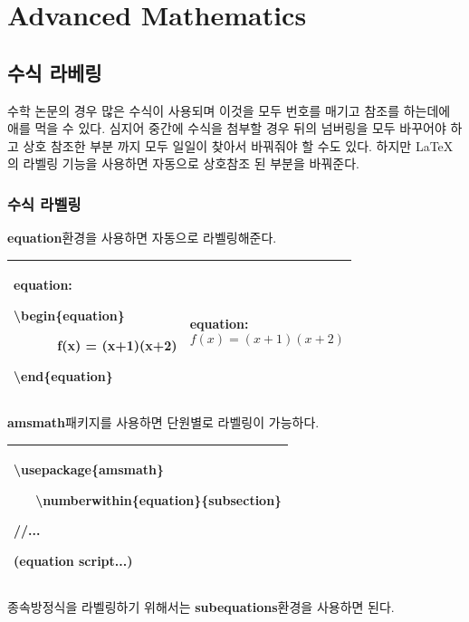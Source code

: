 \documentclass[12pt]{article}
\begin{document}
	\section{Advanced Mathematics}
	\label{se:eq_label}
	\subsection{수식 라베링}
	수학 논문의 경우 많은 수식이 사용되며 이것을 모두 번호를 매기고 참조를 하는데에 애를 먹을 수 있다. 심지어 중간에 수식을 첨부할 경우 뒤의 넘버링을 모두 바꾸어야 하고 상호 참조한 부분 까지 모두 일일이 찾아서 바꿔줘야 할 수도 있다. 하지만 \LaTeX 의 라벨링 기능을 사용하면 자동으로 상호참조 된 부분을 바꿔준다.
	\subsubsection{수식 라벨링}
	\textbf{equation}환경을 사용하면 자동으로 라벨링\를 해준다.\newline
	
	\begin{tabularx}{\textwidth\onehalfspacing}{|X|X|}
		\hline
		equation:
		
		\textbackslash begin\{equation\}
		
		\ \ \ \ \ \ f(x) = (x+1)(x+2)
		
		\textbackslash end\{equation\}
		&equation:
		\begin{equation}
			f(x) = (x+1)(x+2)
		\end{equation}\\
		\hline
	\end{tabularx}
	\newline\newline
	\textbf{amsmath}패키지를 사용하면 단원별로 라벨링이 가능하다. \newline
	
	\begin{tabularx}{\textwidth\onehalfspacing}{|X|}
		\hline
		\textbackslash usepackage\{amsmath\}
		
		\ \ \ \textbackslash numberwithin\{equation\}\{subsection\}
		
		//...
		
		(equation script...)\\
		\hline
	\end{tabularx}
	\newline\newline
	종속방정식을 라벨링하기 위해서는 \textbf{subequations}환경을 사용하면 된다.\newline
	
\end{document}
